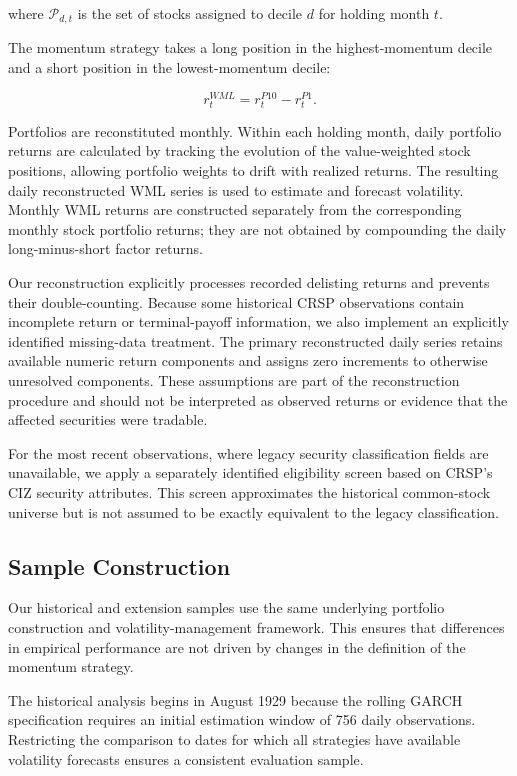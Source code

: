 \documentclass[11pt]{article}
\begin{document}
where $\mathcal{P}_{d,t}$ is the set of stocks assigned
to decile $d$ for holding month $t$.

The momentum strategy takes a long position in the
highest-momentum decile and a short position in the
lowest-momentum decile:

\begin{equation}
r_t^{WML}
=
r_t^{P10}-r_t^{P1}.
\end{equation}

Portfolios are reconstituted monthly. Within each holding
month, daily portfolio returns are calculated by tracking
the evolution of the value-weighted stock positions,
allowing portfolio weights to drift with realized returns.
The resulting daily reconstructed WML series is used to
estimate and forecast volatility. Monthly WML returns are
constructed separately from the corresponding monthly stock
portfolio returns; they are not obtained by compounding the
daily long-minus-short factor returns.

Our reconstruction explicitly processes recorded delisting
returns and prevents their double-counting. Because some
historical CRSP observations contain incomplete return or
terminal-payoff information, we also implement an explicitly
identified missing-data treatment. The primary reconstructed
daily series retains available numeric return components
and assigns zero increments to otherwise unresolved
components. These assumptions are part of the reconstruction
procedure and should not be interpreted as observed returns
or evidence that the affected securities were tradable.

For the most recent observations, where legacy security
classification fields are unavailable, we apply a
separately identified eligibility screen based on CRSP's
CIZ security attributes. This screen approximates the
historical common-stock universe but is not assumed
to be exactly equivalent to the legacy classification.


\subsection{Sample Construction}

Our historical and extension samples use the same underlying
portfolio construction and volatility-management framework.
This ensures that differences in empirical performance are not
driven by changes in the definition of the momentum strategy.

The historical analysis begins in August 1929 because the
rolling GARCH specification requires an initial estimation
window of 756 daily observations. Restricting the comparison
to dates for which all strategies have available volatility
forecasts ensures a consistent evaluation sample.
\end{document}

